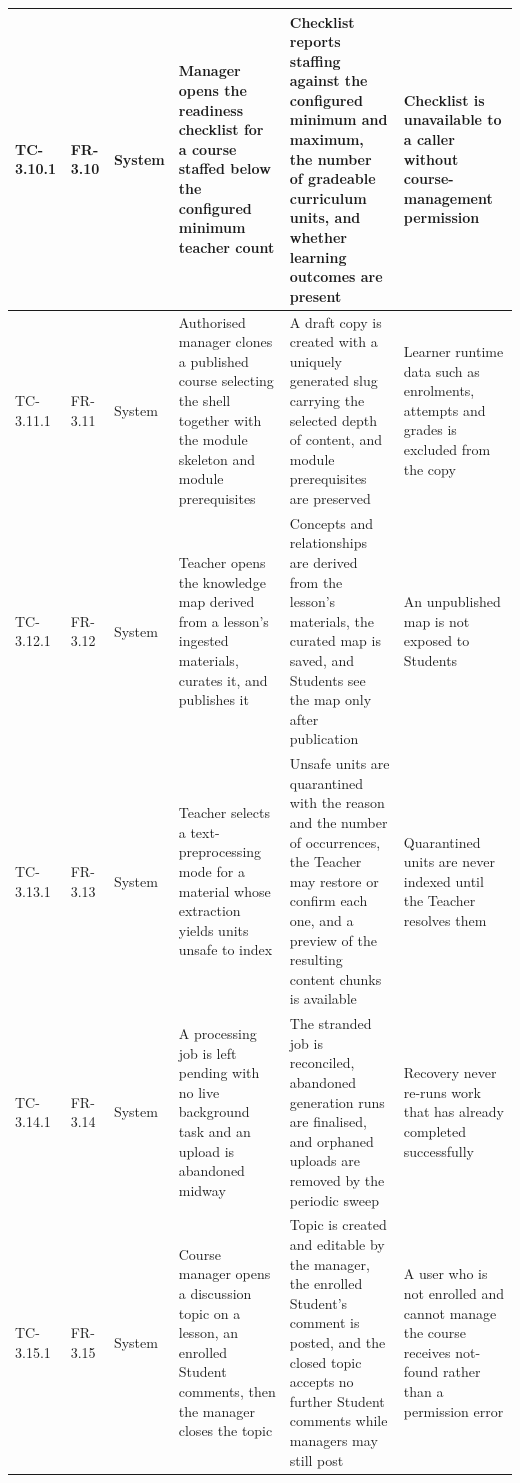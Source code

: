 \begin{longtable}{|>{\centering\arraybackslash}m{}|>{\centering\arraybackslash}m{}|>{\centering\arraybackslash}m{}|m{}|m{}|m{}|}
TC-3.10.1 & FR-3.10 & System & Manager opens the readiness checklist for a course staffed below the configured minimum teacher count & Checklist reports staffing against the configured minimum and maximum, the number of gradeable curriculum units, and whether learning outcomes are present & Checklist is unavailable to a caller without course-management permission \\ \hline

TC-3.11.1 & FR-3.11 & System & Authorised manager clones a published course selecting the shell together with the module skeleton and module prerequisites & A draft copy is created with a uniquely generated slug carrying the selected depth of content, and module prerequisites are preserved & Learner runtime data such as enrolments, attempts and grades is excluded from the copy \\ \hline

TC-3.12.1 & FR-3.12 & System & Teacher opens the knowledge map derived from a lesson's ingested materials, curates it, and publishes it & Concepts and relationships are derived from the lesson's materials, the curated map is saved, and Students see the map only after publication & An unpublished map is not exposed to Students \\ \hline

TC-3.13.1 & FR-3.13 & System & Teacher selects a text-preprocessing mode for a material whose extraction yields units unsafe to index & Unsafe units are quarantined with the reason and the number of occurrences, the Teacher may restore or confirm each one, and a preview of the resulting content chunks is available & Quarantined units are never indexed until the Teacher resolves them \\ \hline

TC-3.14.1 & FR-3.14 & System & A processing job is left pending with no live background task and an upload is abandoned midway & The stranded job is reconciled, abandoned generation runs are finalised, and orphaned uploads are removed by the periodic sweep & Recovery never re-runs work that has already completed successfully \\ \hline

TC-3.15.1 & FR-3.15 & System & Course manager opens a discussion topic on a lesson, an enrolled Student comments, then the manager closes the topic & Topic is created and editable by the manager, the enrolled Student's comment is posted, and the closed topic accepts no further Student comments while managers may still post & A user who is not enrolled and cannot manage the course receives not-found rather than a permission error \\ \hline

\end{longtable}



